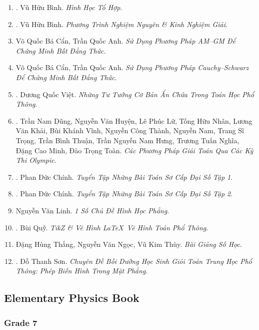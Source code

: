 \documentclass{article}
\begin{document}
\begin{enumerate}
	\item \cite{Binh_HHTH}. Vũ Hữu Bình. \textit{Hình Học Tổ Hợp}.\hfill{\sf[bought]}
	\item \cite{Binh_PTNN}. Vũ Hữu Bình. \textit{Phương Trình Nghiệm Nguyên \& Kinh Nghiệm Giải}.\hfill{\sf[bought]}
	\item Võ Quốc Bá Cẩn, Trần Quốc Anh. \textit{Sử Dụng Phương Pháp AM--GM Để Chứng Minh Bất Đẳng Thức}.
	\item Võ Quốc Bá Cẩn, Trần Quốc Anh. \textit{Sử Dụng Phương Pháp Cauchy--Schwarz Để Chứng Minh Bất Đẳng Thức}.
	\item \cite{Viet2014}. Dương Quốc Việt. \textit{Những Tư Tưởng Cơ Bản Ẩn Chứa Trong Toán Học Phổ Thông}.\hfill{}
	\item \cite{Dung_cac_phuong_phap_giai_toan_qua_cac_ky_thi_olympic_2022}. Trần Nam Dũng, Nguyễn Văn Huyện, Lê Phúc Lữ, Tống Hữu Nhân, Lương Văn Khải, Bùi Khánh Vĩnh, Nguyễn Công Thành, Nguyễn Nam, Trang Sĩ Trọng, Trần Bình Thuận, Trần Nguyễn Nam Hưng, Trương Tuấn Nghĩa, Đặng Cao Minh, Đào Trọng Toàn. \textit{Các Phương Pháp Giải Toán Qua Các Kỳ Thi Olympic}.\hfill{\sf[bought]}
	\item \cite{Chinh2021_tap_1}. Phan Đức Chính. \textit{Tuyển Tập Những Bài Toán Sơ Cấp Đại Số Tập 1}.\hfill{\sf[bought]}
	\item \cite{Chinh2021_tap_2}. Phan Đức Chính. \textit{Tuyển Tập Những Bài Toán Sơ Cấp Đại Số Tập 2}.\hfill{\sf[bought]}
	\item Nguyễn Văn Linh. \textit{1 Số Chủ Đề Hình Học Phẳng}.
	\item \cite{Quy2022}. Bùi Quỹ. \textit{TikZ \& Vẽ Hình \LaTeX\ Vẽ Hình Toán Phổ Thông}.\hfill{}
	\item Đặng Hùng Thắng, Nguyễn Văn Ngọc, Vũ Kim Thùy. \textit{Bài Giảng Số Học}.
	\item \cite{Son2006}. Đỗ Thanh Sơn. \textit{Chuyên Đề Bồi Dưỡng Học Sinh Giỏi Toán Trung Học Phổ Thông: Phép Biến Hình Trong Mặt Phẳng}.\hfill{\sf[bought]}	
\end{enumerate}

\subsection{Elementary Physics Book}

\subsubsection{Grade 7}
\end{document}
